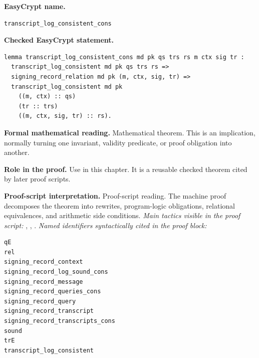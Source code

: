 \begin{formaltheorem}
\noindent\textbf{EasyCrypt name.}
\begin{lstlisting}[language=EasyCrypt,basicstyle=\ttfamily\scriptsize]
transcript_log_consistent_cons
\end{lstlisting}
\noindent\textbf{Checked EasyCrypt statement.}
\begin{lstlisting}[language=EasyCrypt,basicstyle=\ttfamily\scriptsize]
lemma transcript_log_consistent_cons md pk qs trs rs m ctx sig tr :
  transcript_log_consistent md pk qs trs rs =>
  signing_record_relation md pk (m, ctx, sig, tr) =>
  transcript_log_consistent md pk
    ((m, ctx) :: qs)
    (tr :: trs)
    ((m, ctx, sig, tr) :: rs).
\end{lstlisting}
\noindent\textbf{Formal mathematical reading.}
Mathematical theorem. This is an implication, normally turning one invariant, validity predicate, or proof obligation into another.

\noindent\textbf{Role in the proof.}
Use in this chapter. It is a reusable checked theorem cited by later proof scripts.

\noindent\textbf{Proof-script interpretation.}
Proof-script reading. The machine proof decomposes the theorem into rewrites, program-logic obligations, relational equivalences, and arithmetic side conditions.
\emph{Main tactics visible in the proof script:} , , .
\emph{Named identifiers syntactically cited in the proof block:}
\begin{lstlisting}[language=EasyCrypt,basicstyle=\ttfamily\scriptsize]
qE
rel
signing_record_context
signing_record_log_sound_cons
signing_record_message
signing_record_queries_cons
signing_record_query
signing_record_transcript
signing_record_transcripts_cons
sound
trE
transcript_log_consistent
\end{lstlisting}

\end{formaltheorem}

